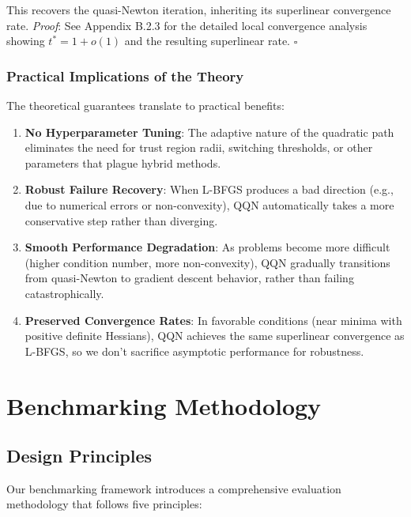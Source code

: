 This recovers the quasi-Newton iteration, inheriting its superlinear convergence rate.
\emph{Proof}: See Appendix B.2.3 for the detailed local convergence analysis showing \(t^* = 1 + o(1)\) and the resulting superlinear rate. \(\square\)

\hypertarget{practical-implications-of-the-theory}{%
\subsubsection{Practical Implications of the Theory}\label{practical-implications-of-the-theory}}

The theoretical guarantees translate to practical benefits:

\begin{enumerate}
\def\labelenumi{\arabic{enumi}.}
\tightlist
\item
  \textbf{No Hyperparameter Tuning}: The adaptive nature of the quadratic path eliminates the need for trust region radii, switching thresholds, or other parameters that plague hybrid methods.
\item
  \textbf{Robust Failure Recovery}: When L-BFGS produces a bad direction (e.g., due to numerical errors or non-convexity), QQN automatically takes a more conservative step rather than diverging.
\item
  \textbf{Smooth Performance Degradation}: As problems become more difficult (higher condition number, more non-convexity), QQN gradually transitions from quasi-Newton to gradient descent behavior, rather than failing catastrophically.
\item
  \textbf{Preserved Convergence Rates}: In favorable conditions (near minima with positive definite Hessians), QQN achieves the same superlinear convergence as L-BFGS, so we don't sacrifice asymptotic performance for robustness.
\end{enumerate}

\hypertarget{benchmarking-methodology}{%
\section{Benchmarking Methodology}\label{benchmarking-methodology}}

\hypertarget{design-principles}{%
\subsection{Design Principles}\label{design-principles}}

Our benchmarking framework introduces a comprehensive evaluation methodology that follows five principles:

